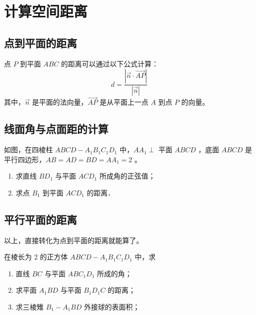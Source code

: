\section{计算空间距离}

\subsection{点到平面的距离}

\begin{theorem}
    点 $P$ 到平面 $A B C$ 的距离可以通过以下公式计算：
    \[
        d = \frac{|\overrightarrow{n} \cdot \overrightarrow{A P}|}{|\overrightarrow{n}|}
    \]
    其中，$\overrightarrow{n}$ 是平面的法向量，$\overrightarrow{A P}$ 是从平面上一点 $A$ 到点 $P$ 的向量。
\end{theorem}

\subsection{线面角与点面距的计算}

\begin{problem}
如图，在四棱柱 $A B C D-A_1 B_1 C_1 D_1$ 中，$A A_1 \perp$ 平面 $A B C D$ ，底面 $A B C D$ 是平行四边形，$A B=A D=B D=A A_1=2$ 。
\begin{enumerate}
    \item[(1)] 求直线 $B D_1$ 与平面 $A C D_1$ 所成角的正弦值；
    \item[(2)] 求点 $B_1$ 到平面 $A C D_1$ 的距离．
\end{enumerate}

\begin{figure} [H]
    \resizebox{0.2\textwidth}{!}{}
\end{figure}

\end{problem}

\subsection{平行平面的距离}

\begin{theorem}
    以上，直接转化为点到平面的距离就能算了。
\end{theorem}

\begin{example}
    在棱长为 2 的正方体 $A B C D-A_1 B_1 C_1 D_1$ 中，求
    \begin{enumerate}
        \item 直线 $B C$ 与平面 $A B C_1 D_1$ 所成的角；
        \item 求平面 $A_1 B D$ 与平面 $B_1 D_1 C$ 的距离；
        \item 求三棱雉 $B_1-A_1 B D$ 外接球的表面积；
    \end{enumerate}
\end{example}

